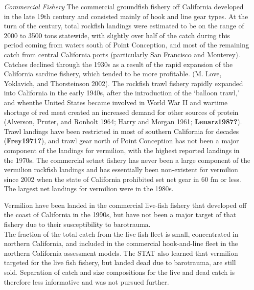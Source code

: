 \documentclass[
  english,
  a4paper,
]{article}
\begin{document}
\emph{Commercial Fishery}
The commercial groundfish fishery off California developed in the late 19th century and consisted mainly of hook and line gear types. At the turn of the century, total rockfish landings were estimated to be on the range of 2000 to 3500 tons statewide, with slightly over half of the catch during this period coming from waters south of Point Conception, and most of the remaining catch from central California ports (particularly San Francisco and Monterey). Catches declined through the 1930s as a result of the rapid expansion of the California sardine fishery, which tended to be more profitable.
(M. Love, Yoklavich, and Thorsteinson 2002). The rockfish trawl fishery rapidly expanded into California in the early 1940s, after the introduction of the `balloon trawl,' and whenthe United States became involved in World War II and wartime shortage of red
meat created an increased demand for other sources of protein (Alverson, Pruter, and Ronholt 1964; Harry and Morgan 1961; \textbf{Lenarz1987?}). Trawl landings have been restricted in most of southern California for decades (\textbf{Frey1971?}), and trawl gear north of Point Conception has not been a major component of the landings for vermilion, with the highest reported landings in the 1970s. The commercial setnet fishery has never been a large component of the vermilion rockfish landings and has essentially been non-existent for vermilion since 2002 when the state of California prohibited set net gear in 60 fm or less. The largest net landings for vermilion were in the 1980s.

Vermilion have been landed in the commercial live-fish fishery that developed off the coast of
California in the 1990s, but have not been a major target of that fishery due to their susceptibility to barotrauma.\\
The fraction of the total catch
from the live fish fleet is small, concentrated in northern California, and included in the commercial hook-and-line
fleet in the northern California assessment models. The STAT also learned that vermilion
targeted for the live fish fishery, but landed
dead due to barotrauma, are still sold. Separation of catch and size compositions for the live and dead catch is therefore less informative and was not pursued further.
\end{document}
